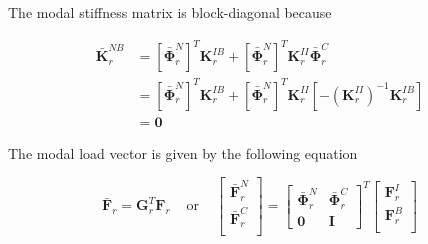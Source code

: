 \documentclass[../DomainDecomposition.tex]{subfiles}
\begin{document}
The modal stiffness matrix is block-diagonal because 

\begin{equation*}
    \begin{aligned}
        \bar{\mathbf{K}}_{r}^{NB} 
        &= 
        \left[\bar{\mathbf{\Phi}}_{r}^{N} \right]^{T} \mathbf{K}_{r}^{IB} + 
        \left[\bar{\mathbf{\Phi}}_{r}^{N} \right]^{T} \mathbf{K}_{r}^{II} 
              \bar{\mathbf{\Phi}}_{r}^{C} \\
        &=
        \left[\bar{\mathbf{\Phi}}_{r}^{N} \right]^{T} \mathbf{K}_{r}^{IB} + 
        \left[\bar{\mathbf{\Phi}}_{r}^{N} \right]^{T} \mathbf{K}_{r}^{II} 
            \left[
                -\left(\mathbf{K}_{r}^{II}\right)^{-1} 
                \mathbf{K}_{r}^{IB} 
            \right] \\
        &= 
        \mathbf{0} 
    \end{aligned}
\end{equation*}

The modal load vector is given by the following equation

\begin{equation}
    \bar{\mathbf{F}}_{r} 
    =
    \mathbf{G}_{r}^{T} \mathbf{F}_{r} 
    \phantom{xx} 
    \text{or} 
    \phantom{xx} 
    \begin{bmatrix}
        \bar{\mathbf{F}}_{r}^{N} \\
        \bar{\mathbf{F}}_{r}^{C} \\
    \end{bmatrix}
    =
    \begin{bmatrix}
        \bar{\mathbf{\Phi}}_{r}^{N} &
        \bar{\mathbf{\Phi}}_{r}^{C} \\ 
        \mathbf{0} & 
        \mathbf{I} 
    \end{bmatrix}^{T} 
    \begin{bmatrix}
        \mathbf{F}_{r}^{I} \\
        \mathbf{F}_{r}^{B} \\
    \end{bmatrix}
\end{equation}
\end{document}
